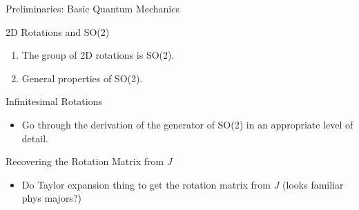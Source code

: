 \documentclass[compress,aspectratio=169,10pt,usenames,dvipsnames]{beamer}
\begin{document}

\begin{frame}{Preliminaries: Basic Quantum Mechanics}



\end{frame}


\begin{frame}{2D Rotations and SO(2)}

\vfill

\begin{enumerate}
  \item The group of 2D rotations is SO(2).
  \item General properties of SO(2).
\end{enumerate}

\vfill

\end{frame}


\begin{frame}{Infinitesimal Rotations}

\begin{itemize}
    \item Go through the derivation of the generator of SO(2) in an appropriate level of detail.
\end{itemize}

\end{frame}


\begin{frame}{Recovering the Rotation Matrix from $J$}

\begin{itemize}
    \item Do Taylor expansion thing to get the rotation matrix from $J$ (looks familiar phys majors?)
\end{itemize}

\end{frame}

\end{document}
